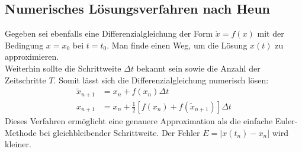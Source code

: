 	\subsection*{Numerisches Lösungsverfahren nach Heun}
		Gegeben sei ebenfalls eine Differenzialgleichung der Form $\dot{x} = f(x)$ mit der Bedingung $x = x_0$ bei $t = t_0$. Man finde einen Weg, um die Lösung $x(t)$ zu approximieren.\\
		Weiterhin sollte die Schrittweite $\Delta t$ bekannt sein sowie die Anzahl der Zeitschritte $T$. Somit lässt sich die Differenzialgleichung numerisch lösen:
		\begin{align}
			\label{eq:erw_euler}
			\tilde{x}_{n+1} &= x_n + f(x_n) \Delta t\\
			x_{n+1} &= x_n + \tfrac{1}{2}[f(x_n) + f(\tilde{x}_{n+1})]\Delta t
		\end{align}
		Dieses Verfahren ermöglicht eine genauere Approximation als die einfache Euler-Methode bei gleichbleibender Schrittweite. Der Fehler $E = |x(t_n)-x_n|$ wird kleiner.
